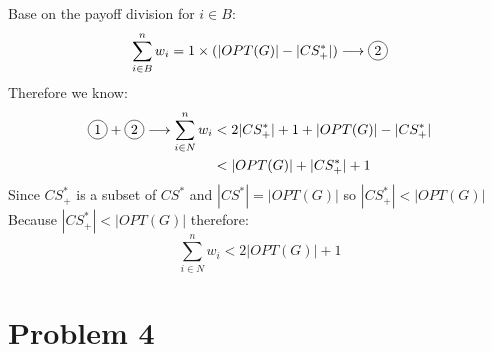 \documentclass{article}
\newcommand*\circled[1]{\tikz[baseline=(char.base)]{
            \node[shape=circle,draw,inner sep=2pt] (char) {#1};}}
\begin{document}
Base on the payoff division for $i \in B$:
$$\sum_{i \in B}^n w_i = 1 \times (|OPT(G)| - |CS^*_+|) \longrightarrow \circled{2}$$
Therefore we know:
\begin{align*}
\circled{1} + \circled{2} \longrightarrow \sum_{i \in N}^n w_i &< 2|CS^*_+| + 1 + |OPT(G)| - |CS^*_+|\\
&< |OPT(G)| + |CS^*_+| + 1
\end{align*}
Since $CS^*_+$ is a subset of $CS^*$ and $|CS^*| = |OPT(G)|$ so $|CS^*_+| < |OPT(G)|$\\
Because $|CS^*_+| < |OPT(G)|$ therefore:
$$\sum_{i \in N}^n w_i < 2|OPT(G)| + 1$$
\newpage
\section{Problem 4}



\end{document}
